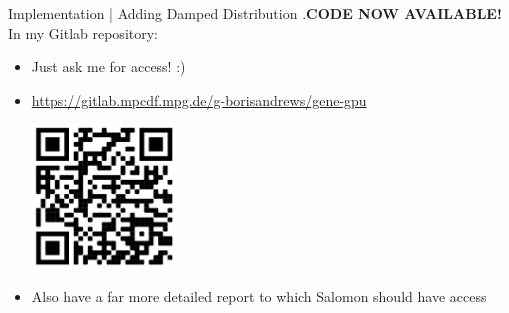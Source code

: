     \begin{frame}{Implementation | Adding Damped Distribution}
        .{\bf CODE NOW AVAILABLE!}
        In my Gitlab repository:
        \begin{itemize}
            \item  Just ask me for access! :)
            \item  \underline{https://gitlab.mpcdf.mpg.de/g-borisandrews/gene-gpu}
            \begin{center}
                \includegraphics[width = 0.3\textwidth]{2 - implementation/2 - adding damped backgrounds/images/QR.png}
            \end{center}
            \item  Also have a far more detailed report to which Salomon should have access
        \end{itemize}
    \end{frame}
    